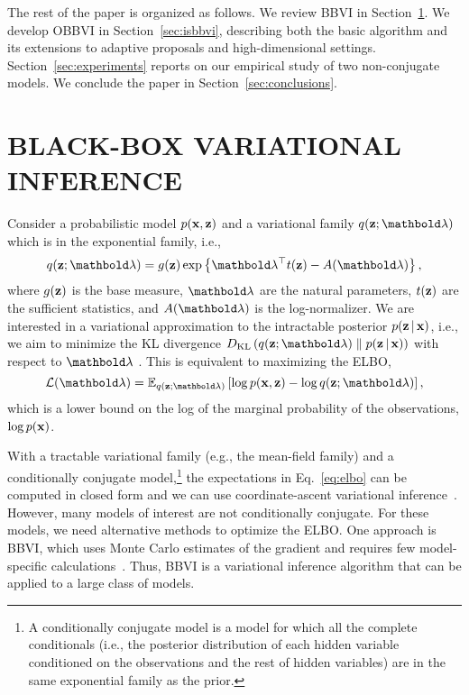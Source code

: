 \documentclass[]{article}
\begin{document}
 The rest of the paper is organized as
follows. We review \gls{BBVI} in Section~\ref{sec:bbvi}. We develop
\gls{OBBVI} in Section~\ref{sec:isbbvi}, describing both the basic
algorithm and its extensions to adaptive proposals and
high-dimensional settings.  Section~\ref{sec:experiments} reports on
our empirical study of two non-conjugate models.  We conclude the paper
in Section~\ref{sec:conclusions}.

\section{BLACK-BOX VARIATIONAL INFERENCE}\label{sec:bbvi}

Consider a probabilistic model $p(\mathbf{x},\mathbf{z})$ and a variational family
$q(\bz ; \blambda)$ which is in the exponential family, i.e.,
\begin{equation}\label{eq:exp_fam}
  q(\bz;\blambda)=g(\bz)\exp\left\{ \blambda^\top t(\bz) - A(\blambda)\right\},
\end{equation}
where $g(\mathbf{z})$ is the base measure, $\blambda$ are the natural
parameters, $t(\mathbf{z})$ are the sufficient statistics, and $A(\blambda)$
is the log-normalizer. We are interested in a variational approximation
to the intractable posterior $p(\mathbf{z}\, | \, \mathbf{x})$, i.e., we aim to minimize
the \gls{KL} divergence $\KL{q(\bz;\blambda)}{p(\bz\g \bx)}$ with
respect to $\blambda$ \citep{Jordan1999}.  This is equivalent to
maximizing the \gls{ELBO},
\begin{equation}\label{eq:elbo}
  \Lcal(\blambda) = \E{q(\bz;\blambda)}{\log p(\bx,\bz)-\log q(\bz;\blambda)},
\end{equation}
which is a lower bound on the log of the marginal probability of the
observations, $\log p(\mathbf{x})$.

With a tractable variational family (e.g., the mean-field family) and a
conditionally conjugate model,\footnote{A conditionally conjugate
model is a model for which all the complete conditionals (i.e., the
posterior distribution of each hidden variable conditioned on the
observations and the rest of hidden variables) are in the same
exponential family as the prior.} the expectations in
Eq.~\ref{eq:elbo} can be computed in closed form and we can use
coordinate-ascent variational
inference~\citep{Ghahramani2001}. However, many models of interest
are not conditionally conjugate.  For these models, we need
alternative methods to optimize the \gls{ELBO}.  One approach is
\gls{BBVI}, which uses Monte Carlo estimates of the gradient and
requires few model-specific calculations~\citep{Ranganath2014}.
Thus, \gls{BBVI} is a variational inference algorithm that can be applied to
a large class of models.
\end{document}
